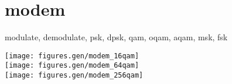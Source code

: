 % 
%

\section{modem}
\label{module:modem}
modulate, demodulate, psk, dpsk, qam, oqam, aqam, msk, fsk

\texttt{[image: figures.gen/modem\_16qam]}   \\
\texttt{[image: figures.gen/modem\_64qam]}   \\
\texttt{[image: figures.gen/modem\_256qam]}  \\

